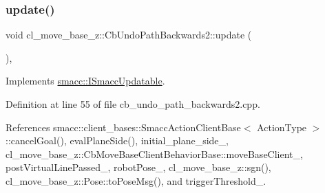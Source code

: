 \subsubsection{\texorpdfstring{update()}{update()}}
{\footnotesize\ttfamily void cl\+\_\+move\+\_\+base\+\_\+z\+::\+Cb\+Undo\+Path\+Backwards2\+::update (\begin{DoxyParamCaption}{ }\end{DoxyParamCaption})\hspace{0.3cm}{\ttfamily [override]}, {\ttfamily [virtual]}}



Implements \hyperlink{classsmacc_1_1ISmaccUpdatable_a84ee0520cbefdb1d412bed54650b028e}{smacc\+::\+I\+Smacc\+Updatable}.



Definition at line 55 of file cb\+\_\+undo\+\_\+path\+\_\+backwards2.\+cpp.



References smacc\+::client\+\_\+bases\+::\+Smacc\+Action\+Client\+Base$<$ Action\+Type $>$\+::cancel\+Goal(), eval\+Plane\+Side(), initial\+\_\+plane\+\_\+side\+\_\+, cl\+\_\+move\+\_\+base\+\_\+z\+::\+Cb\+Move\+Base\+Client\+Behavior\+Base\+::move\+Base\+Client\+\_\+, post\+Virtual\+Line\+Passed\+\_\+, robot\+Pose\+\_\+, cl\+\_\+move\+\_\+base\+\_\+z\+::sgn(), cl\+\_\+move\+\_\+base\+\_\+z\+::\+Pose\+::to\+Pose\+Msg(), and trigger\+Threshold\+\_\+.


